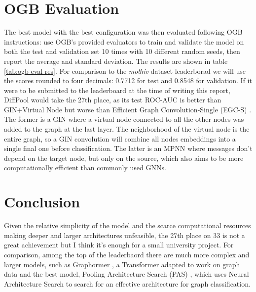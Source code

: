 \documentclass[journal]{IEEEtran}
\begin{document}
\section{OGB Evaluation}
\label{sec:ogb-eval}
The best model with the best configuration was then evaluated following OGB instructions: use OGB's provided evaluators to train and validate the model on both the test and validation set 10 times with 10 different random seeds, then report the average and standard deviation.
The results are shown in table \ref{tab:ogb-eval-res}.
For comparison to the \textit{molhiv} dataset leaderborad we will use the scores rounded to four decimals: 0.7712  for test and 0.8548  for validation.
If it were to be submitted to the leaderboard at the time of writing this report, DiffPool would take the 27th place, as its test ROC-AUC is better than GIN+Virtual Node \cite{xu2018gin} but worse than Efficient Graph Convolution-Single (EGC-S) \cite{tailor2021egc}.
The former is a GIN where a virtual node connected to all the other nodes was added to the graph at the last layer. The neighborhood of the virtual node is the entire graph, so a GIN convolution will combine all nodes embeddings into a single final one before classification.
The latter is an MPNN where messages don't depend on the target node, but only on the source, which also aims to be more computationally efficient than commonly used GNNs.


\section{Conclusion}
Given the relative simplicity of the model and the scarce computational resources making deeper and larger architectures unfeasible, the 27th place on 33 is not a great achievement but I think it's enough for a small university project.
For comparison, among the top of the leaderbaord there are much more complex and larger models, such as Graphormer \cite{ying2021graphormer}, a Transformer \cite{vaswani2017transformer} adapted to work on graph data and the best model, Pooling Architecture Search (PAS) \cite{Wei2021pas}, which uses Neural Architecture Search to search for an effective architecture for graph classification.


% 
% 


\end{document}
